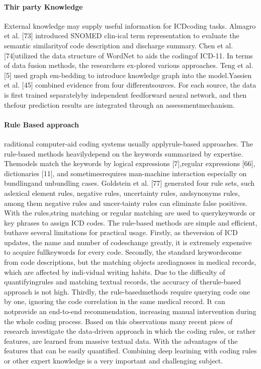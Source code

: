 \paragraph{Thir party Knowledge}
External knowledge may supply useful information for ICDcoding tasks. Almagro et al. [73] introduced SNOMED clin-ical term representation to evaluate the semantic similarityof code description and discharge summary. Chen et al. [74]utilized  the  data  structure  of  WordNet  to  aids  the  codingof ICD-11. In  terms  of  data  fusion  methods,  the  researchers  ex-plored  various  approaches.  Teng  et  al.  [5]  used  graph  em-bedding  to  introduce  knowledge  graph  into  the  model.Yassien  et  al.  [45]  combined  evidence  from  four  differentsources. For each source, the data is first trained separatelyby independent feedforward neural network, and then thefour prediction results are integrated through an assessmentmechanism. 

\paragraph{Rule Based approach}
raditional   computer-aid   coding   systems   usually   applyrule-based  approaches.  The  rule-based  methods  heavilydepend  on  the  keywords  summarized  by  expertise.  Themodels  match  the  keywords  by  logical  expressions  [7],regular  expressions  [66],  dictionaries  [11],  and  sometimesrequires  man-machine  interaction  especially  on  bundlingand unbundling cases.
Goldstein  et  al.  [77]  generated  four  rule  sets,  such  aslexical element rules, negative rules, uncertainty rules, andsynonyms  rules,  among  them  negative  rules  and  uncer-tainty  rules  can  eliminate  false  positives.  With  the  rules,string  matching  or  regular  matching  are  used  to  querykeywords  or  key  phrases  to  assign  ICD  codes.  
The  rule-based  methods  are  simple  and  efficient,  buthave  several  limitations  for  practical  usage.  Firstly,  as  theversion  of  ICD  updates,  the  name  and  number  of  codeschange  greatly,  it  is  extremely  expensive  to  acquire  fullkeywords for every code. Secondly, the standard keywordscome from code descriptions, but the matching objects arediagnoses  in  medical  records,  which  are  affected  by  indi-vidual  writing  habits.  Due  to  the  difficulty  of  quantifyingrules  and  matching  textual  records,  the  accuracy  of  therule-based  approach  is  not  high.  Thirdly,  the  rule-basedmethods  require  querying  code  one  by  one,  ignoring  the code  correlation  in  the  same  medical  record.  It  can  notprovide an end-to-end recommendation, increasing manual intervention during the whole coding process.
Based on this observations many recent pices of research investigate the data-driven approach in which the coding rules, or rather features, are learned from massive textual data. 
With the advantages of the features that can be easily quantified. 
Combining deep learining with coding rules or other expert knowledge is a very important and challenging subject. 

